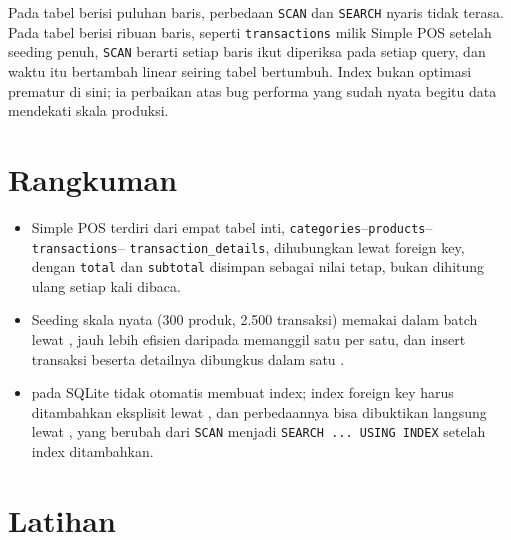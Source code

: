 \begin{warningbox}
Pada tabel berisi puluhan baris, perbedaan \texttt{SCAN} dan
\texttt{SEARCH} nyaris tidak terasa. Pada tabel berisi ribuan baris,
seperti \texttt{transactions} milik Simple POS setelah seeding penuh,
\texttt{SCAN} berarti setiap baris ikut diperiksa pada setiap query,
dan waktu itu bertambah linear seiring tabel bertumbuh. Index bukan
optimasi prematur di sini; ia perbaikan atas bug performa yang sudah
nyata begitu data mendekati skala produksi.
\end{warningbox}


\section{Rangkuman}
\label{sec:desain-basis-data-rangkuman}

\begin{itemize}
  \item Simple POS terdiri dari empat tabel inti,
    \texttt{categories}--\texttt{products}--\texttt{transactions}--%
    \texttt{transaction\_details}, dihubungkan lewat foreign key, dengan
    \texttt{total} dan \texttt{subtotal} disimpan sebagai nilai tetap,
    bukan dihitung ulang setiap kali dibaca.
  \item Seeding skala nyata (300 produk, 2.500 transaksi) memakai
     dalam batch lewat
    , jauh lebih efisien daripada memanggil
     satu per satu, dan insert transaksi
    beserta detailnya dibungkus dalam satu .
  \item {} pada SQLite tidak otomatis membuat index;
    index foreign key harus ditambahkan eksplisit lewat
    , dan perbedaannya bisa dibuktikan langsung
    lewat , yang berubah dari \texttt{SCAN}
    menjadi \texttt{SEARCH ... USING INDEX} setelah index ditambahkan.
\end{itemize}

\section{Latihan}

